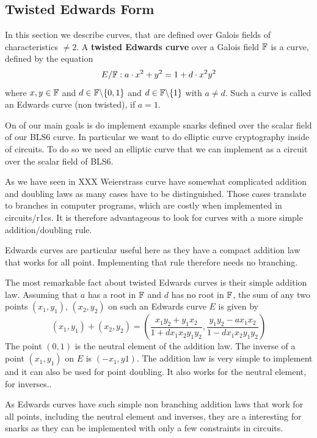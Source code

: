 \subsection{Twisted Edwards Form}
In this section we describe curves, that are defined over Galois fields of characteristics $\neq 2$. 
A \textbf{twisted Edwards curve} over a Galois field $\mathbb{F}$ is a curve, defined by the equation
$$E/\mathbb{F}:a\cdot x^2+y^2= 1+d\cdot x^2y^2$$ 
where $x,y\in \mathbb{F}$ and $d\in \mathbb{F}\backslash\{0,1\}$ and $d\in \mathbb{F}\backslash\{1\}$ with $a\neq d$. Such a curve is called an Edwards curve (non twisted), if $a=1$.

On of our main goals is do implement example snarks defined over the scalar field of our BLS6 curve. In particular we want to do elliptic curve cryptography inside of circuits. To do so we need an elliptic curve that we can implement as a circuit over the scalar field of BLS6. 

As we have seen in XXX Weierstrass curve have somewhat complicated addition and doubling laws as many cases have to be distinguished. Those cases translate to branches in computer programs, which are costly when implemented in circuits/r1cs. It is therefore advantageous to look for curves with a more simple addition/doubling rule.

Edwards curves are particular useful here as they have a compact addition law that works for all point. Implementing that rule therefore needs no branching. 

The most remarkable fact about twisted Edwards curves is their simple addition law. Assuming that $a$ has a root in $\mathbb{F}$ and $d$ has no root in $\mathbb{F}$, the sum of any two points $(x_1, y_1)$, $(x_2, y_2)$ on such an Edwards curve $E$ is given by
$$
(x_1, y_1) + (x_2, y_2) =\left(\frac{x_1y_2+y_1x_2}{1 +dx_1x_2y_1y_2},\frac{y_1y_2-ax_1x_2}{1-dx_1x_2y_1y_2}\right)
$$
The point $(0,1)$ is the neutral element of the addition law. The inverse of a point $(x_1, y_1)$ on $E$ is $(-x_1, y1)$. The addition law is very simple to implement and it can also be used for point doubling. It also works for the neutral element, for inverses..

As Edwards curves have such simple non branching addition laws that work for all points, including the neutral element and inverses, they are a interesting for snarks as they can be implemented with only a few constraints in circuits.

